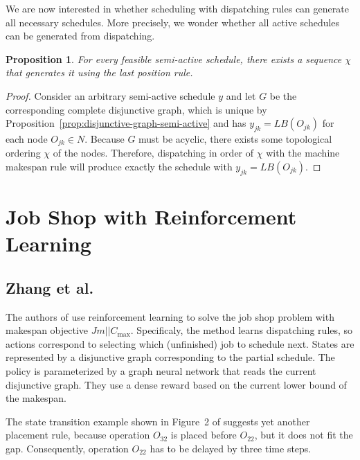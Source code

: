 \documentclass{article}
\theoremstyle{definition}
\theoremstyle{plain}
\newtheorem{proposition}{Proposition}[section]
\begin{document}
We are now interested in whether scheduling with dispatching rules can generate
all necessary schedules. More precisely, we wonder whether all active schedules
can be generated from dispatching.

\begin{proposition}
  For every feasible semi-active schedule, there exists a sequence $\chi$ that
  generates it using the last position rule.
\end{proposition}
\begin{proof}
  Consider an arbitrary semi-active schedule $y$ and let $G$ be the
  corresponding complete disjunctive graph, which is unique by
  Proposition~\ref{prop:disjunctive-graph-semi-active} and has
  $y_{jk} = LB(O_{jk})$ for each node $O_{jk} \in N$. Because $G$ must be
  acyclic, there exists some topological ordering $\chi$ of the nodes.
  Therefore, dispatching in order of $\chi$ with the machine makespan rule will
  produce exactly the schedule with $y_{jk} = LB(O_{jk})$.
\end{proof}


\newpage

\section{Job Shop with Reinforcement Learning}

\subsection{Zhang et al.}

The authors of \cite{zhangLearningDispatchJob2020} use reinforcement learning to
solve the job shop problem with makespan objective $Jm || C_\text{max}$.
Specificaly, the method learns dispatching rules, so actions correspond to
selecting which (unfinished) job to schedule next. States are represented by a
disjunctive graph corresponding to the partial schedule. The policy is
parameterized by a graph neural network that reads the current disjunctive
graph. They use a dense reward based on the current lower bound of the makespan.



The state transition example shown in Figure~2 of
\cite{zhangLearningDispatchJob2020} suggests yet another placement rule, because
operation $O_{32}$ is placed before $O_{22}$, but it does not fit the gap.
Consequently, operation $O_{22}$ has to be delayed by three time steps.
\end{document}
